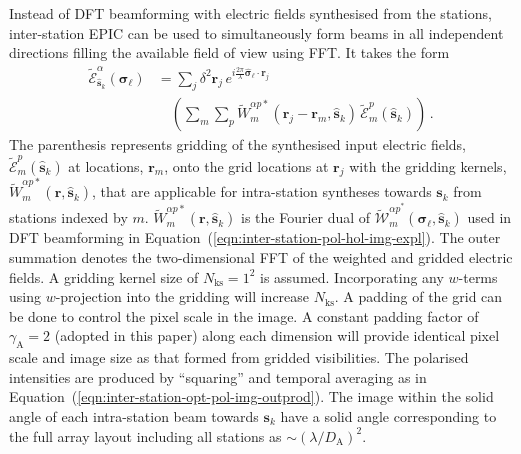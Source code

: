 \documentclass[
  journal=pasa,
  manuscript=article-type,
  year=2020,
  volume=37,
]{cup-journal}
\begin{document}
Instead of DFT beamforming with electric fields synthesised from the stations, inter-station EPIC can be used to simultaneously form beams in all independent directions filling the available field of view using FFT. It takes the form
\begin{align}
  \widetilde{\mathcal{E}}_{\hat{\boldsymbol{s}}_k}^\alpha(\boldsymbol{\sigma}_\ell) &= \sum_j \delta^2 \boldsymbol{r}_j \, e^{i\frac{2\pi}{\lambda} \hat{\boldsymbol{\sigma}}_\ell\cdot\boldsymbol{r}_j} \nonumber\\
  &\quad \left(\sum_{m} \sum_p \widetilde{W}_{m}^{\alpha p*}(\boldsymbol{r}_j-\boldsymbol{r}_{m},\hat{\boldsymbol{s}}_k) \, \widetilde{\mathcal{E}}_m^p(\hat{\boldsymbol{s}}_k) \right) \, . \label{eqn:inter-station-pol-hol-img-epic-expl}
\end{align}
The parenthesis represents gridding of the synthesised input electric fields, $\widetilde{\mathcal{E}}_m^p(\hat{\boldsymbol{s}}_k)$ at locations, $\boldsymbol{r}_{m}$, onto the grid locations at $\boldsymbol{r}_j$ with the gridding kernels, $\widetilde{W}_{m}^{\alpha p*}(\boldsymbol{r},\hat{\boldsymbol{s}}_k)$, that are applicable for intra-station syntheses towards $\boldsymbol{s}_k$ from stations indexed by $m$. $\widetilde{W}_{m}^{\alpha p*}(\boldsymbol{r},\hat{\boldsymbol{s}}_k)$ is the Fourier dual of $\widetilde{\mathcal{W}}_{m}^{{\alpha p}^*}(\boldsymbol{\sigma}_\ell,\hat{\boldsymbol{s}}_k)$ used in DFT beamforming in Equation~(\ref{eqn:inter-station-pol-hol-img-expl}). The outer summation denotes the two-dimensional FFT of the weighted and gridded electric fields. A gridding kernel size of $N_\textrm{ks}=1^2$ is assumed. Incorporating any $w$-terms using $w$-projection into the gridding will increase $N_\textrm{ks}$. A padding of the grid can be done to control the pixel scale in the image. A constant padding factor of $\gamma_\textrm{A}=2$ (adopted in this paper) along each dimension will provide identical pixel scale and image size as that formed from gridded visibilities. The polarised intensities are produced by ``squaring'' and temporal averaging as in Equation~(\ref{eqn:inter-station-opt-pol-img-outprod}). The image within the solid angle of each intra-station beam towards $\boldsymbol{s}_k$ have a solid angle corresponding to the full array layout including all stations as $\sim (\lambda/D_\textrm{A})^2$.
\end{document}
